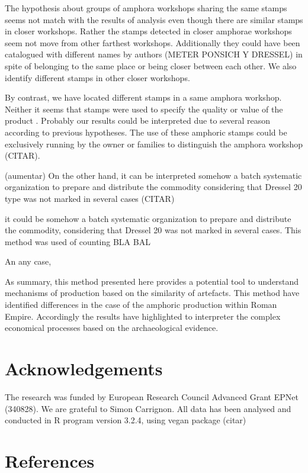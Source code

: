 \documentclass[review]{elsarticle}
\begin{document}
The hypothesis about groups of amphora workshops sharing the same stamps seems not match with the results of analysis even though there are similar stamps in closer workshops. Rather the stamps detected in closer amphorae workshops seem not move from other farthest workshops. Additionally they could have been catalogued with different names by authors (METER PONSICH Y DRESSEL) in spite of belonging to the same place or being closer between each other. We also identify different stamps in other closer workshops. 

By contrast, we have located different stamps in a same amphora workshop. Neither it seems that stamps were used to specify the quality or value of the product \citep{callender}. Probably our results could be interpreted due to several reason according to previous hypotheses. The use of these amphoric stamps could be exclusively running by the owner or families to distinguish the amphora workshop (CITAR). 

(aumentar)
On the other hand, it can be interpreted somehow a batch systematic organization to prepare and distribute the commodity considering that Dressel 20 type was not marked in several cases (CITAR)


it could be somehow a batch systematic organization to prepare and distribute the commodity, considering that Dressel 20 was not marked in several cases. This method was used of counting BLA BAL 

An any case, 

As summary, this method presented here provides a potential tool to understand mechanisms of production based on the similarity of artefacts. This method have identified differences in the case of the amphoric production within Roman Empire. Accordingly the results have highlighted to interpreter the complex economical processes based on  the archaeological evidence. 



\section{Acknowledgements}

The research was funded by European Research Council Advanced Grant EPNet (340828). We are grateful to Simon Carrignon. 
All data has been analysed and conducted in R program version 3.2.4, using vegan package (citar) 


\section{References}


\end{document}
